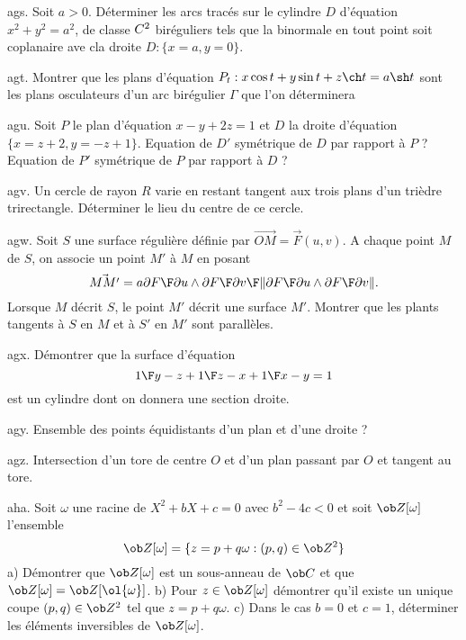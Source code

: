 \exo [Level=2,Fight=3,Learn=1,Field=\Surfaces,Type=\Exercices,Origin=\MP] ags. 
Soit $a>0$. Déterminer les arcs tracés sur le cylindre $D$ d'équation $x^2+y^2=a^2$, de classe $\sc C^2$ biréguliers 
tels que la binormale en tout point soit coplanaire  ave cla droite $D:\{x=a,y=0\}$. 

\exo [Level=2,Fight=3,Learn=1,Field=\Surfaces|\Enveloppes,Type=\Exercices,Origin=\MP] agt. 
Montrer que les plans d'équation $P_t:x\cos t+y\sin t+z\ch t=a\sh t$ sont les plans osculateurs d'un arc birégulier $\Gamma$ 
que l'on déterminera

\exo [Level=2,Fight=1,Learn=1,Field=\GéométrieSpatiale,Type=\Exercices,Origin=] agu. 
Soit $P$ le plan d'équation $x-y+2z=1$ et $D$ la droite d'équation $\{x=z+2,y=-z+1\}$. \pn
Equation de $D'$ symétrique de $D$ par rapport à $P$ ? \pn
Equation de $P'$ symétrique de $P$ par rapport à $D$ ?

\exo [Level=2,Fight=2,Learn=1,Field=\Surfaces,Type=\Exercices,Origin=\MP] agv. 
Un cercle de rayon $R$ varie en restant tangent aux trois plans d'un trièdre trirectangle. 
Déterminer le lieu du centre de ce cercle.  

\exo [Level=2,Fight=1,Learn=1,Field=\Surfaces,Type=\Exercices,Origin=] agw. 
Soit $S$ une surface régulière définie par $\vec{OM}=\vec F(u,v)$. 
A chaque point $M$ de $S$, on associe un point $M'$ à $M$ 
en posant 
$$
\vec{MM'}=a{{\partial F\F\partial u}\wedge{\partial F\F\partial v}\F\|{\partial F\F\partial u}\wedge{\partial F\F\partial v}\|}.
$$
Lorsque $M$ décrit $S$, le point $M'$ décrit une surface $M'$. 
Montrer que les plants tangents à $S$ en $M$ et à $S'$ en $M'$ sont parallèles. 

\exo [Level=2,Fight=0,Learn=0,Field=\Surfaces,Type=\Exercices,Origin=] agx. 
Démontrer que la surface d'équation 
$$
{1\F y-z}+{1\F z-x}+{1\F x-y}=1
$$ 
est un cylindre dont on donnera une section droite. 

\exo [Level=2,Fight=1,Learn=1,Field=\Surfaces,Type=\Exercices,Origin=] agy. 
Ensemble des points équidistants d'un plan et d'une droite ?

\exo [Level=2,Fight=2,Learn=1,Field=\Surfaces,Type=\Exercices,Origin=] agz. 
Intersection d'un tore de centre $O$ et d'un plan passant par $O$ et tangent au tore. 

\exo [Level=1,Fight=2,Learn=2,Field=\Anneaux,Type=\Exercices,Origin=] aha. 
Soit $\omega$ une racine de $X^2+bX+c=0$ avec $b^2-4c<0$ et soit $\ob Z[\omega]$ l'ensemble 
$$
\ob Z[\omega]=\{z=p+q\omega:(p,q)\in\ob Z^2\}
$$
a) Démontrer que $\ob Z[\omega]$ est un sous-anneau de $\ob C$ et que $\ob Z[\omega]=\ob Z[\ol{\omega}]$. \pn
b) Pour $z\in\ob Z[\omega]$ démontrer qu'il existe un unique coupe $(p,q)\in\ob Z^2$ tel que $z=p+q\omega$. \pn
c) Dans le cas $b=0$ et $c=1$, déterminer les éléments inversibles de $\ob Z[\omega]$. 

